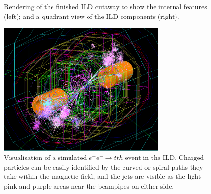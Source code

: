 \begin{figure}[p]%
	\centering
    \qquad
    \caption{Rendering of the finished \acrshort{ILD} cutaway to show the internal features (left); and a quadrant view of the \acrshort{ILD} components (right).}%
    \label{figure:colliders/ILD/double}%
\end{figure}

\begin{figure}[p]
	\centering
	\includegraphics[width=0.75\textwidth]{../Pictures/SimulatedEvent1.png}
	\caption{Visualisation of a simulated $e^+ e^- \rightarrow t \overline{t} h$ event in the \acrshort{ILD}. Charged particles can be easily identified by the curved or spiral paths they take within the magnetic field, and the jets are visible as the light pink and purple areas near the beampipes on either side.}
	\label{figure:colliders/ILD/tth-simulation}
\end{figure}

